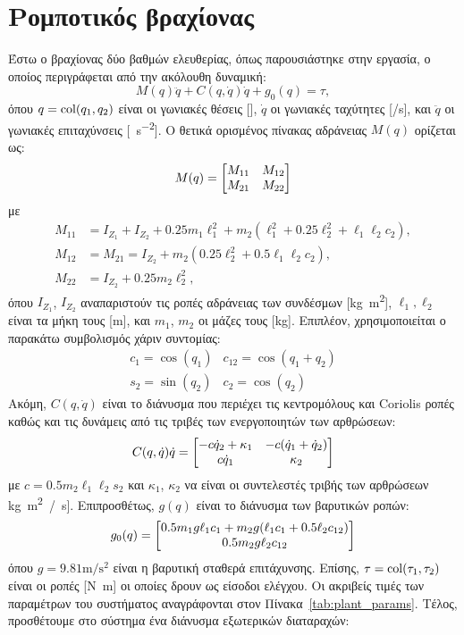 \section{Ρομποτικός βραχίονας}
\label{exampleB}
Έστω ο βραχίονας δύο βαθμών ελευθερίας, όπως παρουσιάστηκε στην εργασία\cite{bechlioulis2008robust, Theodorakopoulos2016}, ο οποίος περιγράφεται από την ακόλουθη δυναμική:
\[
    M(q)\ddot q + C(q,\dot q)\dot q + g_0(q) = \tau,
\]
όπου $q = \operatorname{col}(q_1, q_2)$ είναι οι γωνιακές θέσεις [\si{\rad}], $\dot q$ οι γωνιακές ταχύτητες [\si{\rad/\second}], και $\ddot q$ οι γωνιακές επιταχύνσεις  [\si{\rad\per\second^2}]. Ο θετικά ορισμένος πίνακας αδράνειας $M(q)$ ορίζεται ως:
\[
    M(q) = \bmqty{M_{11} & M_{12}\\ M_{21} & M_{22}}
\]
με
\begin{align*}
    M_{11} &= I_{Z_1} + I_{Z_2} + 0.25 m_1 \ell_1^2 
    + m_2(\ell_1^2 + 0.25 \ell_2^2 + \ell_1 \ell_2 c_2),\\
    M_{12} &= M_{21} = I_{Z_2} + m_2 (0.25 \ell_2^2 + 0.5 \ell_1 \ell_2 c_2),\\
    M_{22} &= I_{Z_2} + 0.25 m_2 \ell_2^2,
\end{align*}
όπου $I_{Z_1}$, $I_{Z_2}$ αναπαριστούν τις ροπές αδράνειας των συνδέσμων [\si{\kilo\gram \metre^2}], $\ell_1, \ell_2$ είναι τα μήκη τους [\si{\metre}], και $m_1$, $m_2$ οι μάζες τους [\si{\kilo\gram}]. Επιπλέον, χρησιμοποιείται ο παρακάτω συμβολισμός χάριν συντομίας:
\[\begin{array}{ll}
    c_1 = \cos(q_1) & c_{12} = \cos(q_1 + q_2)\\
    s_2 = \sin(q_2) & c_2 = \cos(q_2)
\end{array}\]
Ακόμη, $C(q, \dot q)$ είναι το διάνυσμα που περιέχει τις κεντρομόλους και \textlatin{Coriolis} ροπές καθώς και τις δυνάμεις από τις τριβές των ενεργοποιητών των αρθρώσεων:
\[
    C(q, \dot q)\dot q = \bmqty{-c \dot q_2 + \kappa_1 & -c(\dot q_1 + \dot q_2)\\ c \dot q_1 & \kappa_2}
\]
με $c = 0.5 m_2 \ell_1 \ell_2 s_2$ και $\kappa_1$, $\kappa_2$ να είναι οι συντελεστές τριβής των αρθρώσεων \si{\kilo\gram \metre^2 / \second}]. Επιπροσθέτως, $g(q)$ είναι το διάνυσμα των βαρυτικών ροπών:
\[
    g_0(q) = 
    \bmqty{0.5 m_1 g \ell_1 c_1 + m_2 g (\ell_1 c_1 + 0.5 \ell_2 c_{12}) \\
        0.5 m_2 g \ell_2 c_{12}}  
\]
όπου $g = 9.81 \si{\metre\per\second^2}$ είναι η βαρυτική σταθερά επιτάχυνσης. Επίσης, $\tau = \operatorname{col}(\tau_1, \tau_2)$ είναι οι ροπές [\si{\newton\metre}] οι οποίες δρουν ως είσοδοι ελέγχου. Οι ακριβείς τιμές των παραμέτρων του συστήματος αναγράφονται στον Πίνακα~\ref{tab:plant_params}. Τέλος, προσθέτουμε στο σύστημα ένα διάνυσμα εξωτερικών διαταραχών:
